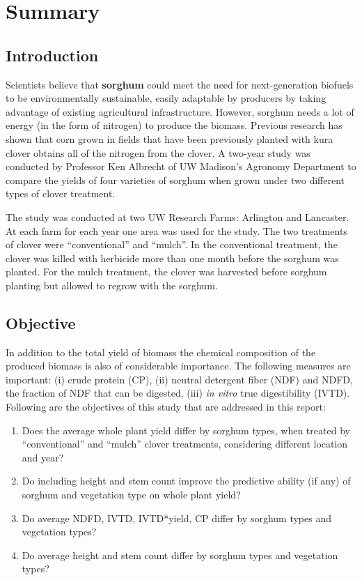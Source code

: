 \section*{Summary} \label{Sec_Summary}
\subsection*{Introduction}
Scientists believe that {\bf{sorghum}} could meet the need for next-generation biofuels to be environmentally sustainable, easily adaptable by producers by taking advantage of existing agricultural infrastructure. However, sorghum needs a lot of energy (in the form of nitrogen) to produce the biomass. Previous research has shown that corn grown in fields that have been previously planted with kura clover obtains all of the nitrogen from the clover. A two-year study was conducted by Professor Ken Albrecht of UW Madison's Agronomy Department to compare the yields of four varieties of sorghum when grown under two different types of clover treatment. 

The study was conducted at two UW Research Farms: Arlington and Lancaster. At each farm for each year one area was used for the study. The two treatments of clover were ``conventional'' and ``mulch''.  In the conventional treatment, the clover was killed with herbicide more than one month before the sorghum was planted. For the mulch treatment, the clover was harvested before sorghum planting but allowed to regrow with the sorghum. 

\subsection*{Objective}
In addition to the total yield of biomass the chemical composition of the produced biomass is also of considerable importance. The following measures are important: (i) crude protein (CP), (ii) neutral
detergent fiber (NDF) and NDFD, the fraction of NDF that can be digested, (iii) {\emph{in vitro}} true digestibility (IVTD). Following are the objectives of this study that are addressed in this report:
\begin{enumerate}
\item Does the average whole plant yield differ by sorghum types, when treated by ``conventional'' and ``mulch'' clover treatments, considering different location and year?
\item Do including height and stem count improve the predictive ability (if any) of sorghum and vegetation type on whole plant yield?
\item Do average NDFD, IVTD, IVTD*yield, CP differ by sorghum types and vegetation types?
\item Do average height and stem count differ by sorghum types and vegetation types?
\end{enumerate}

